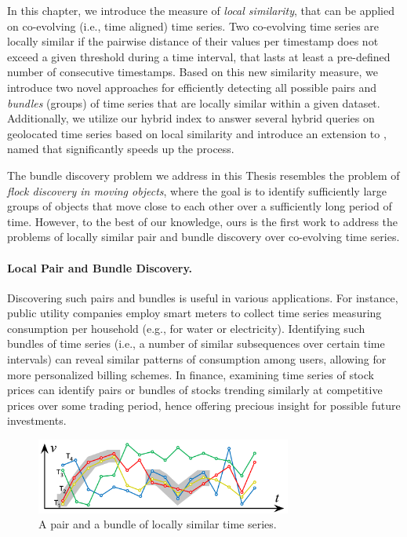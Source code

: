 
\graphicspath{{Papers/SSTD2019/}{Papers/SIGSpatial2019/}}

In this chapter, we introduce the measure of \textit{local similarity}, that can be applied on co-evolving (i.e., time aligned) time series. Two co-evolving time series are locally similar if the pairwise distance of their values per timestamp does not exceed a given threshold during a time interval, that lasts at least a pre-defined number of consecutive timestamps. Based on this new similarity measure, we introduce two novel approaches for efficiently detecting all possible pairs and \textit{bundles} (groups) of time series that are locally similar within a given dataset. Additionally, we utilize our hybrid \btsr index to answer several hybrid queries on geolocated time series based on local similarity and introduce an extension to \btsr, named \sbtsr that significantly speeds up the process.

The bundle discovery problem we address in this Thesis resembles the problem of \textit{flock discovery in moving objects}, where the goal is to identify sufficiently large groups of objects that move close to each other over a sufficiently long period of time. However, to the best of our knowledge, ours is the first work to address the problems of locally similar pair and bundle discovery over co-evolving time series. 

\paragraph{Local Pair and Bundle Discovery.} Discovering such pairs and bundles is useful in various applications. For instance, public utility companies employ smart meters to collect time series measuring consumption per household (e.g., for water or electricity). Identifying such bundles of time series (i.e., a number of similar subsequences over certain time intervals) can reveal similar patterns of consumption among users, allowing for more personalized billing schemes. In finance, examining time series of stock prices can identify pairs or bundles of stocks trending similarly at competitive prices over some trading period, hence offering precious insight for possible future investments.

\begin{figure}[b]
    \centering
    \includegraphics[width=0.75\textwidth]{figures/pair_flock_ex.png}
    \caption{A pair and a bundle of locally similar time series.}
    \label{fig:pair_flock_ex}
\end{figure}

